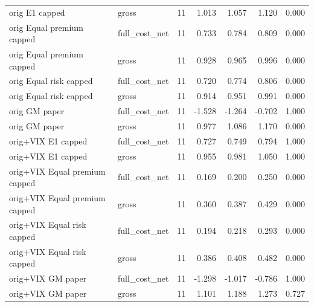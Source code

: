 \begin{tabular}{llrrrrr}
orig E1 capped & gross & 11 & 1.013 & 1.057 & 1.120 & 0.000 \\
orig Equal premium capped & full\_cost\_net & 11 & 0.733 & 0.784 & 0.809 & 0.000 \\
orig Equal premium capped & gross & 11 & 0.928 & 0.965 & 0.996 & 0.000 \\
orig Equal risk capped & full\_cost\_net & 11 & 0.720 & 0.774 & 0.806 & 0.000 \\
orig Equal risk capped & gross & 11 & 0.914 & 0.951 & 0.991 & 0.000 \\
orig GM paper & full\_cost\_net & 11 & -1.528 & -1.264 & -0.702 & 1.000 \\
orig GM paper & gross & 11 & 0.977 & 1.086 & 1.170 & 0.000 \\
orig+VIX E1 capped & full\_cost\_net & 11 & 0.727 & 0.749 & 0.794 & 1.000 \\
orig+VIX E1 capped & gross & 11 & 0.955 & 0.981 & 1.050 & 1.000 \\
orig+VIX Equal premium capped & full\_cost\_net & 11 & 0.169 & 0.200 & 0.250 & 0.000 \\
orig+VIX Equal premium capped & gross & 11 & 0.360 & 0.387 & 0.429 & 0.000 \\
orig+VIX Equal risk capped & full\_cost\_net & 11 & 0.194 & 0.218 & 0.293 & 0.000 \\
orig+VIX Equal risk capped & gross & 11 & 0.386 & 0.408 & 0.482 & 0.000 \\
orig+VIX GM paper & full\_cost\_net & 11 & -1.298 & -1.017 & -0.786 & 1.000 \\
orig+VIX GM paper & gross & 11 & 1.101 & 1.188 & 1.273 & 0.727 \\
\bottomrule
\end{tabular}

